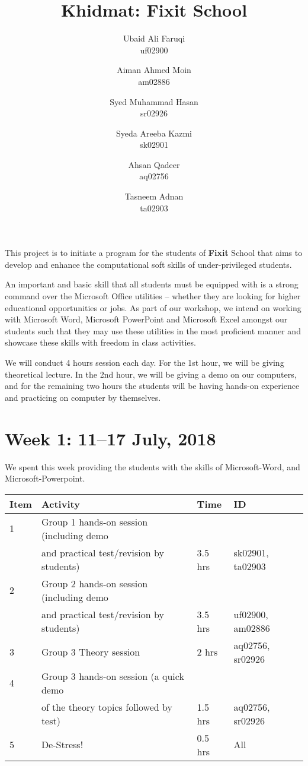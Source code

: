 \documentclass{article}
\title {Khidmat: Fixit School}
\author{
  Ubaid Ali Faruqi\\ uf02900
  \and
  Aiman Ahmed Moin\\ am02886
  \and
  Syed Muhammad Hasan\\ sr02926
  \and
  Syeda Areeba Kazmi\\ sk02901
  \and 
  Ahsan Qadeer\\ aq02756
  \and
  Tasneem Adnan\\ ta02903
}
\date{}
\begin{document}
\maketitle


This project is to initiate a program for the students of \textbf{Fixit} School that aims to develop and
enhance the computational soft skills of under-privileged  students.



An important and basic skill that all students must be equipped with is a strong command over the Microsoft Office utilities – whether they are looking for higher educational opportunities or jobs. As part of our workshop, we intend on working with Microsoft Word, Microsoft PowerPoint and Microsoft Excel amongst our students such that they may use these utilities in the most proficient manner and showcase these skills with freedom in class activities.

We will conduct 4 hours session each day. For the 1st hour, we will be giving theoretical lecture. In the 2nd hour, we will be giving a demo on our computers, and for the remaining two hours the students will be having hands-on experience and practicing on computer by themselves.

\newpage %
\section*{Week 1: 11--17 July, 2018}

We spent this week providing the students with the skills of Microsoft-Word, and Microsoft-Powerpoint.

\begin{tabular}{|l|l|l|l|}
  \hline
  Item 	& Activity & Time & ID \\\hline\hline
  1	& Group 1 hands-on session (including demo&&\\ &and practical test/revision by students) & 3.5 hrs & sk02901, ta02903 \\\hline
  2	& Group 2 hands-on session (including demo&&\\ &and practical test/revision by students) & 3.5 hrs & uf02900, am02886 \\\hline
  3	& Group 3 Theory session & 2 hrs & aq02756, sr02926 \\\hline
  4	& Group 3 hands-on session (a quick demo&&\\ &of the theory topics followed by test) & 1.5 hrs & aq02756, sr02926 \\\hline
  5	& De-Stress! & 0.5 hrs & All \\\hline    
\end{tabular}
\end{document}

